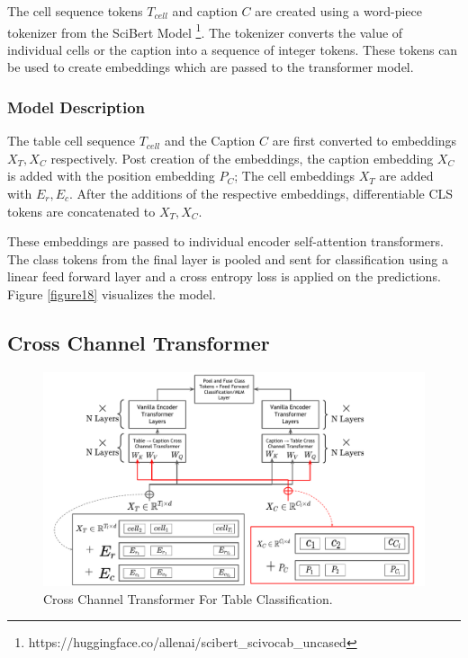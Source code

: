 The cell sequence tokens $T_{cell}$ and caption $C$ are created using a word-piece tokenizer from the SciBert Model \footnote{https://huggingface.co/allenai/scibert\_scivocab\_uncased}. The tokenizer converts the value of individual cells or the caption into a sequence of integer tokens. These tokens can be used to create embeddings which are passed to the transformer model. 

\subsubsection{Model Description}
The table cell sequence $T_{cell}$ and the Caption $C$ are first converted to embeddings $X_T, X_C$ respectively. Post creation of the embeddings, the caption embedding  $X_C$ is added with the position embedding $P_C$; The cell embeddings $X_T$ are added with $E_r,E_c$. After the additions of the respective embeddings, differentiable CLS tokens are concatenated to $X_T,X_C$.

These embeddings are passed to individual encoder self-attention transformers. The class tokens from the final layer is pooled and sent for classification using a linear feed forward layer and a cross entropy loss is applied on the predictions. Figure \ref{figure18} visualizes the model. 


\subsection{Cross Channel Transformer}
\label{table_classification:models:cross-channel}
\begin{figure}[h]
    \centering
    \includegraphics[width=\maxwidth{\textwidth}]{src/images/Pic-Export-CC-Trans-Thesis.pdf}
    \caption{Cross Channel Transformer For Table Classification. }
    \label{figure\arabic{figurecounter}}
\end{figure}

